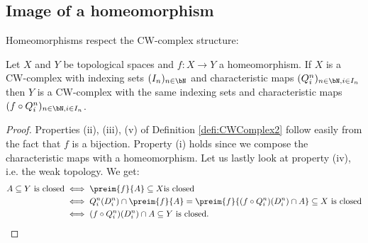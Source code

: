 \subsection{Image of a homeomorphism}

Homeomorphisms respect the CW-complex structure: 

\begin{lem} \label{lem:homeomorph}
    Let $X$ and $Y$ be topological spaces and $f \colon X \to Y$ a homeomorphism. 
    If $X$ is a CW-complex with indexing sets $(I_n)_{n \in \bN}$ and characteristic maps $(Q_i^n)_{n \in \bN, i \in I_n}$ then $Y$ is a CW-complex with the same indexing sets and characteristic maps $(f \circ Q_i^n)_{n \in \bN, i \in I_n}$. 
    \href{https://github.com/scholzhannah/CWComplexes/blob/7be4872a05b534011cc969eb5b80a4b7f0bf57e2/CWcomplexes/Constructions.lean#L140-L182}{\faExternalLink}
\end{lem}
\begin{proof}
    Properties (ii), (iii), (v) of Definition \ref{defi:CWComplex2} follow easily from the fact that $f$ is a bijection. 
    Property (i) holds since we compose the characteristic maps with a homeomorphism. 
    Let us lastly look at property (iv), i.e. the weak topology. 
    We get: 
    \begin{equation*}
        \begin{split}
            A \subseteq Y \text{ is closed} &\iff \preim{f}{A} \subseteq X \text {is closed} \\
            &\iff Q_i^n(D_i^n) \cap \preim{f}{A} = \preim{f}{(f \circ Q_i^n)(D_i^n) \cap A} \subseteq X \text{ is closed} \\ 
            &\iff (f \circ Q_i^n)(D_i^n) \cap A \subseteq Y \text{ is closed}.
        \end{split}
    \end{equation*}
\end{proof}